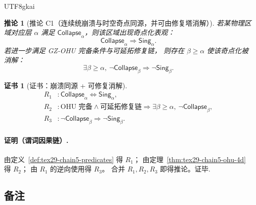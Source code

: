 \documentclass[12pt]{article}
\newtheorem{corollary}{推论}[section]
\newtheorem{Certificate}{证书}[section]
\begin{document}
\begin{CJK*}{UTF8}{gkai}
\begin{corollary}[推论 C1（连续统崩溃与时空奇点同源，并可由修复塔消解）]
\label{cor:tex29-chain5-singularity-collapse}
若某物理区域对应层 $\alpha$ 满足 $\mathsf{Collapse}_{\alpha}$，则该区域出现奇点化表观：
\[
  \mathsf{Collapse}_{\alpha}\Rightarrow \mathsf{Sing}_{\alpha}.
\]
若进一步满足 GZ-OHU 完备条件与可延拓修复链，
则存在 $\beta\ge \alpha$ 使该奇点化被消解：
\[
  \exists \beta\ge \alpha,\ \neg\mathsf{Collapse}_{\beta}
  \Rightarrow
  \neg\mathsf{Sing}_{\beta}.
\]
\end{corollary}

\begin{Certificate}[证书：崩溃同源 + 可修复消解]
\label{cert:tex29-chain5-singularity-collapse}
\[
\begin{aligned}
  R_1 &: \mathsf{Collapse}_{\alpha}\Longleftrightarrow \mathsf{Sing}_{\alpha},\\
  R_2 &: \text{OHU 完备} \wedge \text{可延拓修复链}\Rightarrow \exists \beta\ge\alpha,\ \neg\mathsf{Collapse}_{\beta},\\
  R_3 &: \neg\mathsf{Collapse}_{\beta}\Rightarrow \neg\mathsf{Sing}_{\beta}.
\end{aligned}
\]
\end{Certificate}

\paragraph{证明（谓词因果链）.}
由定义~\ref{def:tex29-chain5-predicates} 得 $R_1$；
由定理~\ref{thm:tex29-chain5-ohu-4d} 得 $R_2$；
由 $R_1$ 的逆向使用得 $R_3$。
合并 $R_1,R_2,R_3$ 即得推论。证毕.

\subsection{备注}
\label{subsec:tex29-chain-discrete-kqemb-tower-4d-remarks}


\end{CJK*}
\end{document}
